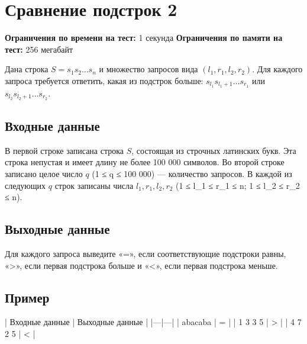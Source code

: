 \documentclass{article}
\begin{document}
\section{Сравнение подстрок 2}

\textbf{Ограничения по времени на тест:} 1 секунда
\textbf{Ограничения по памяти на тест:} 256 мегабайт

Дана строка $S = s_1s_2 \ldots s_n$ и множество запросов вида $(l_1, r_1, l_2, r_2)$. Для каждого запроса требуется ответить, какая из подстрок больше: $s_{l_1}s_{l_1+1} \ldots s_{r_1}$ или $s_{l_2}s_{l_2+1} \ldots s_{r_2}$.

\subsection{Входные данные}

В первой строке записана строка $S$, состоящая из строчных латинских букв. Эта строка непустая и имеет длину не более 100 000 символов. Во второй строке записано целое число $q$ (1 ≤ q ≤ 100 000) — количество запросов. В каждой из следующих $q$ строк записаны числа $l_1, r_1, l_2, r_2$ (1 ≤ l_1 ≤ r_1 ≤ n; 1 ≤ l_2 ≤ r_2 ≤ n).

\subsection{Выходные данные}

Для каждого запроса выведите «=», если соответствующие подстроки равны, «>», если первая подстрока больше и «<», если первая подстрока меньше.

\subsection{Пример}

| Входные данные | Выходные данные |
|---|---|
| abacaba | = |
| 1 3 3 5 | > |
| 4 7 2 5 | < |
\end{document}
